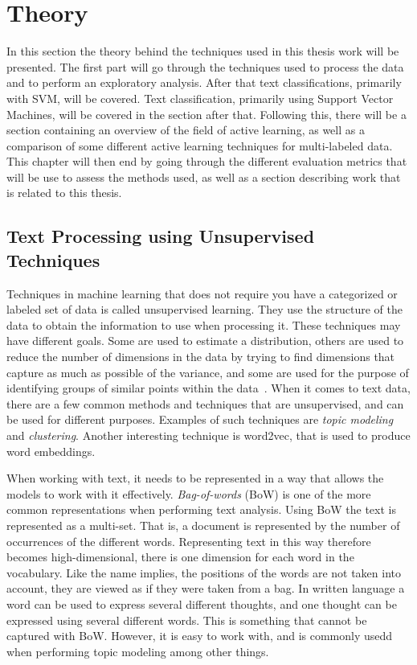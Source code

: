 \chapter{Theory}
\label{cha:theory}

In this section the theory behind the techniques used in this thesis work will be presented.
The first part will go through the techniques used to process the data and to perform an exploratory analysis.
After that text classifications, primarily with SVM, will be covered.
Text classification, primarily using Support Vector Machines, will be covered in the section after that.
Following this, there will be a section containing an overview of the field of active learning, as well as a comparison of some different active learning techniques for multi-labeled data.
This chapter will then end by going through the different evaluation metrics that will be use to assess the methods used, as well as a section describing work that is related to this thesis.

\section{Text Processing using Unsupervised Techniques}

Techniques in machine learning that does not require you have a categorized or labeled set of data is called unsupervised learning.
They use the structure of the data to obtain the information to use when processing it.
These techniques may have different goals.
Some are used to estimate a distribution, others are used to reduce the number of dimensions in the data by trying to find dimensions that capture as much as possible of the variance, and some are used for the purpose of identifying groups of similar points within the data~\cite{bishop2006pattern}.
When it comes to text data, there are a few common methods and techniques that are unsupervised, and can be used for different purposes.
Examples of such techniques are \textit{topic modeling} and \textit{clustering}.
Another interesting technique is word2vec, that is used to produce word embeddings.

When working with text, it needs to be represented in a way that allows the models to work with it effectively.
\textit{Bag-of-words} (BoW) is one of the more common representations when performing text analysis. 
Using BoW the text is represented as a multi-set. 
That is, a document is represented by the number of occurrences of the different words. 
Representing text in this way therefore becomes high-dimensional, there is one dimension for each word in the vocabulary. 
Like the name implies, the positions of the words are not taken into account, they are viewed as if they were taken from a bag. 
In written language a word can be used to express several different thoughts, and one thought can be expressed using several different words.
This is something that cannot be captured with BoW.
However, it is easy to work with, and is commonly usedd when performing topic modeling among other things.

